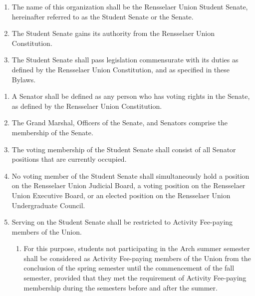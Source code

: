 \documentclass{uniondoc}
\begin{document}

\begin{enumerate}
	\item The name of this organization shall be the Rensselaer Union Student Senate, hereinafter referred to as the Student Senate or the Senate.
	\item The Student Senate gains its authority from the Rensselaer Union Constitution.
	\item The Student Senate shall pass legislation commensurate with its duties as defined by the Rensselaer Union Constitution, and as specified in these Bylaws.
\end{enumerate}

\begin{enumerate}
	\item A Senator shall be defined as any person who has voting rights in the Senate, as defined by the Rensselaer Union Constitution.
	\item The Grand Marshal, Officers of the Senate, and Senators comprise the membership of the Senate.
	\item The voting membership of the Student Senate shall consist of all Senator positions that are currently occupied.
	\item No voting member of the Student Senate shall simultaneously hold a position on the Rensselaer Union Judicial Board, a voting position on the Rensselaer Union Executive Board, or an elected position on the Rensselaer Union Undergraduate Council.
	\item Serving on the Student Senate shall be restricted to Activity Fee-paying members of the Union.
	      \begin{enumerate}
		      \item For this purpose, students not participating in the Arch summer semester shall be considered as Activity Fee-paying members of the Union from the conclusion of the spring semester until the commencement of the fall semester, provided that they met the requirement of Activity Fee-paying membership during the semesters before and after the summer.
	      \end{enumerate}
\end{enumerate}

\end{document}
